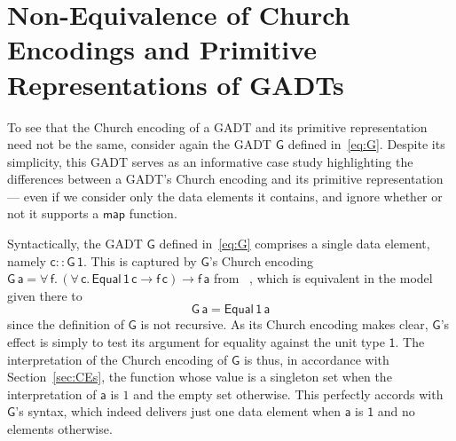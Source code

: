 \documentclass[acmsmall,screen,review,anonymous]{acmart}
\theoremstyle{definition}
\begin{document}
\section{Non-Equivalence of Church Encodings and Primitive
  Representations of GADTs}\label{sec:non-equiv}

To see that the Church encoding of a GADT and its primitive
representation need not be the same, consider again the GADT
$\mathsf{G}$ defined in~\eqref{eq:G}. Despite its simplicity, this
GADT serves as an informative case study highlighting the differences
between a GADT's Church encoding and its primitive representation ---
even if we consider only the data elements it contains, and ignore
whether or not it supports a $\mathsf{map}$ function.

\begin{example}\label{ex:g1}

Syntactically, the GADT $\mathsf{G}$ defined in~\eqref{eq:G} comprises
a single data element, namely $\mathsf{c :: G \, 1}$. This is captured
by $\mathsf{G}$'s Church encoding $\mathsf{G\,a} = \mathsf{\forall\,f.
  \, (\forall\,c.\, Equal\,1\,c \to f\,c) \to f\,a}$ from
~\cite{atk12}, which is equivalent in the model given there to
\[\mathsf{G\, a = Equal\,1\,a}\]
since the definition of $\mathsf{G}$ is not recursive. As its Church
encoding makes clear, 
$\mathsf{G}$'s
effect is simply to test its argument for equality against the unit
type $\mathsf{1}$. The interpretation of the Church encoding of
$\mathsf{G}$ is thus, in accordance with Section~\ref{sec:CEs}, the
function whose value is a singleton set when the interpretation of
$\mathsf{a}$ is $1$ and the empty set otherwise. This perfectly
accords with $\mathsf{G}$'s syntax, which indeed delivers just one
data element when $\mathsf{a}$ is $\mathsf{1}$ and no elements
otherwise.


\end{example}
\end{document}
